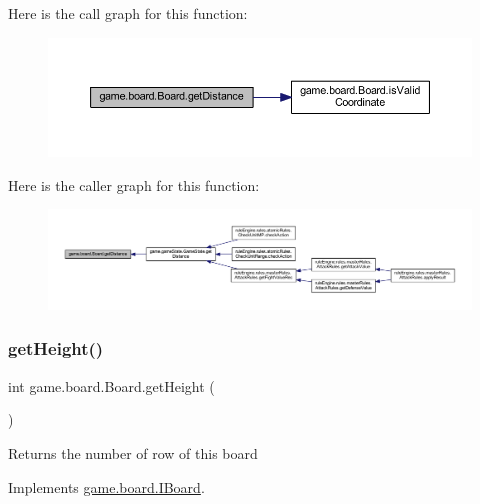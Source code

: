 Here is the call graph for this function\+:
\nopagebreak
\begin{figure}[H]
\begin{center}
\leavevmode
\includegraphics[width=350pt]{classgame_1_1board_1_1_board_a169a1f68a5c996127f2f762551405026_cgraph}
\end{center}
\end{figure}
Here is the caller graph for this function\+:
\nopagebreak
\begin{figure}[H]
\begin{center}
\leavevmode
\includegraphics[width=350pt]{classgame_1_1board_1_1_board_a169a1f68a5c996127f2f762551405026_icgraph}
\end{center}
\end{figure}
\mbox{\label{classgame_1_1board_1_1_board_a3c3b04d752eee7f25fcf2a57d0675374}} 
\subsubsection{\texorpdfstring{get\+Height()}{getHeight()}}
{\footnotesize\ttfamily int game.\+board.\+Board.\+get\+Height (\begin{DoxyParamCaption}{ }\end{DoxyParamCaption})\hspace{0.3cm}{\ttfamily [inline]}}

\begin{DoxyReturn}{Returns}
the number of row of this board 
\end{DoxyReturn}


Implements \mbox{\hyperlink{interfacegame_1_1board_1_1_i_board_ac72f72b8a25b8cd594e4c8c1a6ce6ca8}{game.\+board.\+I\+Board}}.

